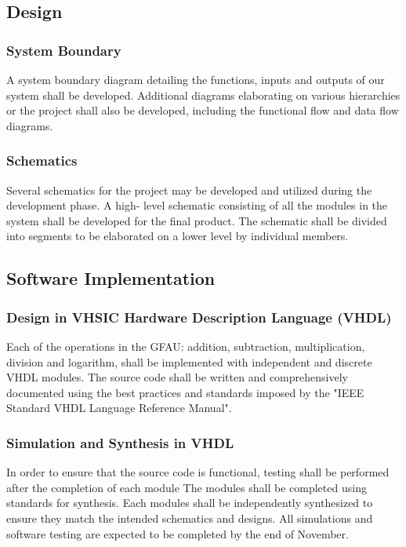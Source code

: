 \documentclass[12pt]{extarticle}
\begin{document}
        \subsection{Design}

            \subsubsection{System Boundary} A system boundary diagram detailing
            the functions, inputs and outputs of our system shall be developed.
            Additional diagrams elaborating on various hierarchies or the
            project shall also be developed, including the functional flow and
            data flow diagrams.

            \subsubsection{Schematics} Several schematics for the project may
            be developed and utilized during the development phase. A high-
            level schematic consisting of all the modules in the system shall
            be developed for the final product. The schematic shall be divided
            into segments to be elaborated on a lower level by individual
            members.

        \subsection{Software Implementation}

            \subsubsection{Design in VHSIC Hardware Description Language
            (VHDL)} Each of the operations in the GFAU: addition, subtraction,
            multiplication, division and logarithm, shall be implemented with
            independent and discrete VHDL modules. The source code shall be
            written and comprehensively documented using the best practices and
            standards imposed by the "IEEE Standard VHDL Language Reference
            Manual".

            \subsubsection{Simulation and Synthesis in VHDL} In order to ensure
            that the source code is functional, testing shall be performed
            after the completion of each module The modules shall be completed
            using standards for synthesis. Each modules shall be independently
            synthesized to ensure they match the intended schematics and
            designs. All simulations and software testing are expected to be
            completed by the end of November.
\end{document}
